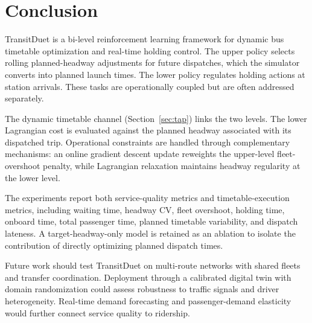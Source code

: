 \section{Conclusion}
\label{sec:conclusion}

TransitDuet is a bi-level reinforcement learning framework for dynamic bus timetable optimization and real-time holding control.
The upper policy selects rolling planned-headway adjustments for future dispatches, which the simulator converts into planned launch times. The lower policy regulates holding actions at station arrivals. These tasks are operationally coupled but are often addressed separately.

The dynamic timetable channel (Section~\ref{sec:tap}) links the two levels. The lower Lagrangian cost is evaluated against the planned headway associated with its dispatched trip.
Operational constraints are handled through complementary mechanisms: an online gradient descent update reweights the upper-level fleet-overshoot penalty, while Lagrangian relaxation maintains headway regularity at the lower level.

The experiments report both service-quality metrics and timetable-execution metrics, including waiting time, headway CV, fleet overshoot, holding time, onboard time, total passenger time, planned timetable variability, and dispatch lateness. A target-headway-only model is retained as an ablation to isolate the contribution of directly optimizing planned dispatch times.

Future work should test TransitDuet on multi-route networks with shared fleets and transfer coordination. Deployment through a calibrated digital twin with domain randomization could assess robustness to traffic signals and driver heterogeneity. Real-time demand forecasting and passenger-demand elasticity would further connect service quality to ridership.
